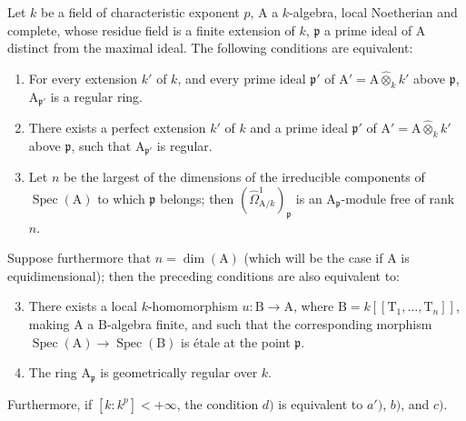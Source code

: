 \begin{theorem}[18.11.10]
\label{IV.18.11.10}
Let $k$ be a field of characteristic exponent $p$, $\mathrm{A}$ a $k$-algebra, local Noetherian and complete, whose residue field is a finite extension of $k$, $\mathfrak{p}$ a prime ideal of $\mathrm{A}$ distinct from the maximal ideal.
The following conditions are equivalent:
\begin{enumerate}[label=\alph*)]
  \item For every extension $k'$ of $k$, and every prime ideal $\mathfrak{p}'$ of $\mathrm{A}'=\mathrm{A}\widehat{\otimes}_kk'$ above $\mathfrak{p}$, $\mathrm{A}_{\mathfrak{p}'}$ is a regular ring.
\item[a$'$)] There exists a perfect extension $k'$ of $k$ and a prime ideal $\mathfrak{p}'$ of $\mathrm{A}'=\mathrm{A}\widehat{\otimes}_kk'$ above $\mathfrak{p}$, such that $\mathrm{A}_{\mathfrak{p}'}$ is regular.
  \item Let $n$ be the largest of the dimensions of the irreducible components of $\operatorname{Spec}(\mathrm{A})$ to which $\mathfrak{p}$ belongs; then $(\hat{\Omega}^1_{\mathrm{A}/k})_\mathfrak{p}$ is an $\mathrm{A}_\mathfrak{p}$-module free of rank $n$.
\end{enumerate}
Suppose furthermore that $n=\dim(\mathrm{A})$ (which will be the case if $\mathrm{A}$ is equidimensional); then the preceding conditions are also equivalent to:
\begin{enumerate}[label=\alph*)]
  \setcounter{enumi}{2}
  \item There exists a local $k$-homomorphism $u:\mathrm{B}\to\mathrm{A}$, where $\mathrm{B}=k[[\mathrm{T}_1,\ldots,\mathrm{T}_n]]$, making $\mathrm{A}$ a $\mathrm{B}$-algebra finite, and such that the corresponding morphism $\operatorname{Spec}(\mathrm{A})\to\operatorname{Spec}(\mathrm{B})$ is \'etale at the point $\mathfrak{p}$.
  \item The ring $\mathrm{A}_\mathfrak{p}$ is geometrically regular over $k$.
\end{enumerate}
Furthermore, if $[k:k^p]<+\infty$, the condition $d)$ is equivalent to $a')$, $b)$, and $c)$.
\end{theorem}

